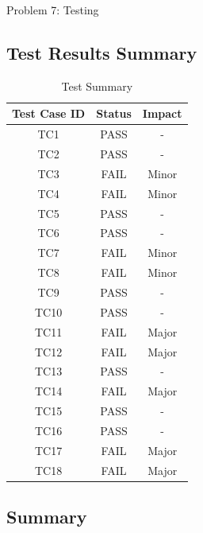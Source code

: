 \documentclass[a4paper,12pt]{article}
\begin{document}
\begin{section}{Problem 7: Testing}
\begin{itemize}
	
\end{itemize}


\subsection{Test Results Summary}

\begin{table}[htp]
	\centering
	\caption{Test Summary} \vspace{0.5cm} \label{tab:difficulty_table} 
	\begin{tabular}{||c|c|c||}
		\hline  \hline \textbf{Test Case ID} & \textbf{Status} & \textbf{Impact} \\
		\hline \hline
		TC1 & PASS & - \\ 
		\hline
		TC2 & PASS & - \\ 
		\hline
		TC3 & FAIL & Minor \\ 
		\hline
		TC4 & FAIL & Minor \\ 
		\hline
		TC5 & PASS & - \\ 
		\hline
		TC6 & PASS & - \\ 
		\hline
		TC7 & FAIL & Minor \\ 
		\hline
		TC8 & FAIL & Minor \\ 
		\hline
		TC9 & PASS & - \\ 
		\hline
		TC10 & PASS & - \\ 
		\hline
		TC11 & FAIL & Major \\ 
		\hline
		TC12 & FAIL & Major \\ 
		\hline
		TC13 & PASS & - \\ 
		\hline
		TC14 & FAIL & Major \\ 
		\hline
		TC15 & PASS & - \\ 
		\hline
		TC16 & PASS & - \\ 
		\hline
		TC17 & FAIL & Major \\ 
		\hline
		TC18 & FAIL & Major \\ 
		\hline	
	\end{tabular}
\end{table}


\subsection{Summary}
\centering
{}


\end{section}
\end{document}
